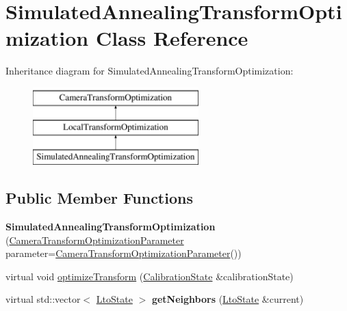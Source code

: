 \hypertarget{classSimulatedAnnealingTransformOptimization}{\section{\-Simulated\-Annealing\-Transform\-Optimization \-Class \-Reference}
\label{classSimulatedAnnealingTransformOptimization}
}
\-Inheritance diagram for \-Simulated\-Annealing\-Transform\-Optimization\-:\begin{figure}[H]
\begin{center}
\leavevmode
\includegraphics[height=3.000000cm]{classSimulatedAnnealingTransformOptimization}
\end{center}
\end{figure}
\subsection*{\-Public \-Member \-Functions}
\begin{DoxyCompactItemize}
\item 
\hypertarget{classSimulatedAnnealingTransformOptimization_a7cfecf67ac1750612ea38d7d26b884db}{{\bfseries \-Simulated\-Annealing\-Transform\-Optimization} (\hyperlink{classCameraTransformOptimizationParameter}{\-Camera\-Transform\-Optimization\-Parameter} parameter=\hyperlink{classCameraTransformOptimizationParameter}{\-Camera\-Transform\-Optimization\-Parameter}())}\label{classSimulatedAnnealingTransformOptimization_a7cfecf67ac1750612ea38d7d26b884db}

\item 
virtual void \hyperlink{classSimulatedAnnealingTransformOptimization_ab6690824306f9cd1f98f420a8d85e0f7}{optimize\-Transform} (\hyperlink{classCalibrationState}{\-Calibration\-State} \&calibration\-State)
\item 
\hypertarget{classSimulatedAnnealingTransformOptimization_a345f3cfb53e0f1f9512032f6523d1a20}{virtual std\-::vector$<$ \hyperlink{classLtoState}{\-Lto\-State} $>$ {\bfseries get\-Neighbors} (\hyperlink{classLtoState}{\-Lto\-State} \&current)}\label{classSimulatedAnnealingTransformOptimization_a345f3cfb53e0f1f9512032f6523d1a20}

\end{DoxyCompactItemize}
